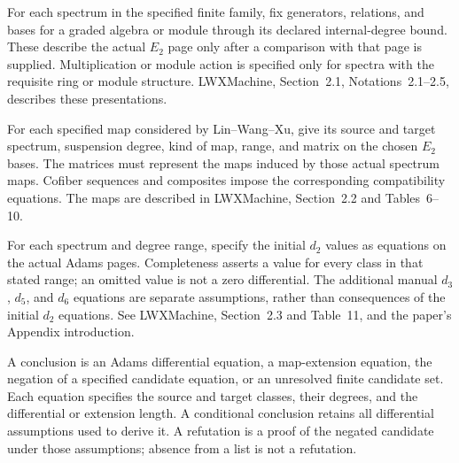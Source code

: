 \begin{definition}
  \label{def:lin-e2-page-catalogue}
  \notready
  For each spectrum in the specified finite family, fix generators,
  relations, and bases for a graded algebra or module through its
  declared internal-degree bound. These describe the actual $E_2$
  page only after a comparison with that page is supplied. Multiplication
  or module action is specified only for spectra with the requisite ring
  or module structure. LWXMachine, Section~2.1, Notations~2.1--2.5,
  describes these presentations.
\end{definition}

\begin{definition}
  \label{def:lin-map-catalogue}
  \notready
  For each specified map considered by Lin--Wang--Xu, give its
  source and target spectrum, suspension degree, kind of map, range,
  and matrix on the chosen $E_2$ bases. The matrices must represent
  the maps induced by those actual spectrum maps. Cofiber sequences
  and composites impose the corresponding compatibility equations.
  The maps are described in LWXMachine, Section~2.2 and Tables~6--10.
\end{definition}

\begin{definition}
  \label{def:lin-d2-catalogue}
  \notready
  For each spectrum and degree range, specify the initial $d_2$
  values as equations on the actual Adams pages. Completeness asserts
  a value for every class in that stated range; an omitted value is
  not a zero differential. The additional manual $d_3$, $d_5$, and
  $d_6$ equations are separate assumptions, rather than consequences
  of the initial $d_2$ equations. See LWXMachine, Section~2.3 and
  Table~11, and the paper's Appendix introduction.
\end{definition}

\begin{definition}
  \label{def:lin-propagated-output-record}
  \notready
  A conclusion is an Adams differential equation, a map-extension
  equation, the negation of a specified candidate equation, or an
  unresolved finite candidate set. Each equation specifies the source
  and target classes, their degrees, and the differential or extension
  length. A conditional conclusion retains all differential assumptions
  used to derive it. A refutation is a proof of the negated candidate
  under those assumptions; absence from a list is not a refutation.
\end{definition}

